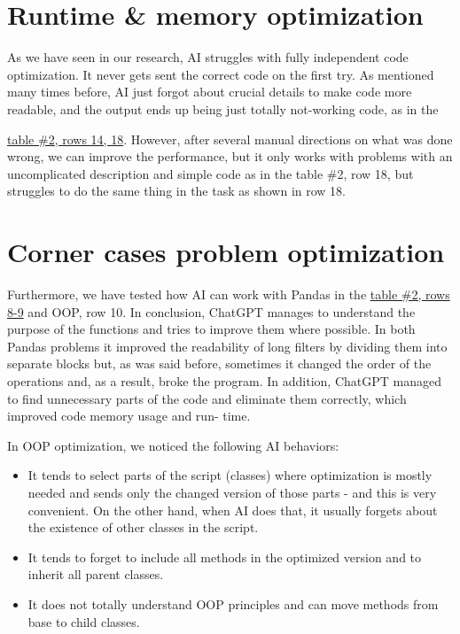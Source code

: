 \documentclass[12pt]{report}
\begin{document}
	\section{Runtime \& memory optimization}


		As we have seen in our research, AI struggles with fully independent code optimization. It never gets sent the correct code on the first try. As mentioned many times
		before, AI just forgot about crucial details to make code more readable, and the
		output ends up being just totally not-working code, as in the

		\href{https://docs.google.com/spreadsheets/d/1qXPyAJsOOpmtxIoGqObwG5mTaLU3IWO0SQRGbjZPhEc/edit#gid=0}{table \#2, rows 14, 18}. However, after several manual directions on what was done wrong, we can improve the
		performance, but it only works with problems with an uncomplicated description and
		simple code as in the table \#2, row 18, but struggles to do
		the same thing in the task as shown in row 18.


	\section{Corner cases problem optimization}

		Furthermore, we have tested how AI can work with Pandas in the \href{https://docs.google.com/spreadsheets/d/1qXPyAJsOOpmtxIoGqObwG5mTaLU3IWO0SQRGbjZPhEc/edit#gid=0}{table \#2, rows 8-9} and OOP, row 10. In conclusion, ChatGPT manages to understand the purpose of
		the functions and tries to improve them where possible. In both Pandas problems
		it improved the readability of long filters by dividing them into separate blocks but,
		as was said before, sometimes it changed the order of the operations and, as a result, broke the program. In addition, ChatGPT managed to find unnecessary parts of the code and
		eliminate them correctly, which improved code memory usage and run-
		time.

		In OOP optimization, we noticed the following AI behaviors:

		\begin{itemize}
			\item It tends to select parts of the script (classes) where optimization is mostly
			needed and sends only the changed version of those parts - and this is very
			convenient. On the other hand, when AI does that, it usually forgets about the
			existence of other classes in the script.
			\item It tends to forget to include all methods in the optimized version and
			to inherit all parent classes.
			\item It does not totally understand OOP principles and can move methods
			from base to child classes.
		\end{itemize}
\end{document}
